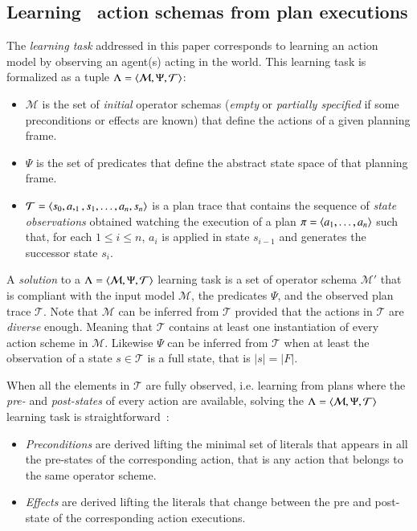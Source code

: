 \subsection{Learning \strips\ action schemas from plan executions}
The {\em learning task} addressed in this paper corresponds to learning an action model by observing an agent(s) acting in the world. This learning task is formalized as a tuple $\Lambda={\langle \mathcal{M},\Psi,\mathcal{T} \rangle}$:
\begin{itemize}
\item $\mathcal{M}$ is the set of {\em initial} operator schemas ({\em empty} or {\em partially specified} if some preconditions or effects are known) that define the actions of a given planning frame.
\item $\Psi$ is the set of predicates that define the abstract state space of that planning frame. 
\item $\mathcal{T}={\langle s_0,a,_1,s_1,\ldots,a_n,s_{n} \rangle}$ is a plan trace that contains the sequence of {\em state observations} obtained watching the execution of a plan $\pi={\langle a_1, \ldots, a_n \rangle}$ such that, for each {\small $1\leq i\leq n$}, $a_i$ is applied in state $s_{i-1}$ and generates the successor state $s_i$. 
\end{itemize}

A {\em solution} to a $\Lambda={\langle \mathcal{M},\Psi,\mathcal{T} \rangle}$ learning task is a set of operator schema $\mathcal{M}'$ that is compliant with the input model $\mathcal{M}$, the predicates $\Psi$, and the observed plan trace $\mathcal{T}$. Note that $\mathcal{M}$ can be inferred from $\mathcal{T}$ provided that the actions in $\mathcal{T}$ are {\em diverse} enough. Meaning that $\mathcal{T}$ contains at least one instantiation of every action scheme in $\mathcal{M}$. Likewise $\Psi$ can be inferred from $\mathcal{T}$ when at least the observation of a state $s\in \mathcal{T}$ is a full state, that is $|s|=|F|$.

When all the elements in $\mathcal{T}$ are fully observed, i.e. learning from plans where the {\em pre-} and {\em post-states} of every action are available, solving the $\Lambda={\langle \mathcal{M},\Psi,\mathcal{T} \rangle}$ learning task is straightforward~\cite{jimenez2012review}:
\begin{itemize}
  \item {\em Preconditions} are derived lifting the minimal set of literals that appears in all the pre-states of the corresponding action, that is any action that belongs to the same operator scheme.
  \item {\em Effects} are derived lifting the literals that change between the pre and post-state of the corresponding action executions.
\end{itemize}

